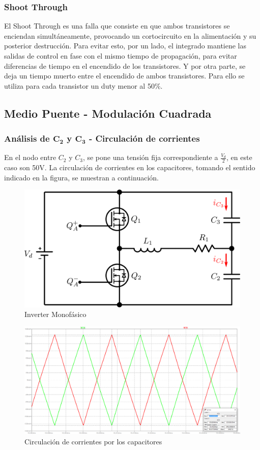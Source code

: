\documentclass[e4_tp3_main.tex]{subfiles}
\begin{document}
\subsubsection{Shoot Through}

El Shoot Through es una falla que consiste en que ambos transistores se enciendan simultáneamente, provocando un cortocircuito en la alimentación y su posterior destrucción. Para evitar esto, por un lado, el integrado mantiene las salidas de control en fase con el mismo tiempo de propagación, para evitar diferencias de tiempo en el encendido de los transistores. Y por otra parte, se deja un tiempo muerto entre el encendido de ambos transistores. Para ello se utiliza para cada transistor un duty menor al 50\%.
\newpage
\subsection{Medio Puente - Modulación Cuadrada}

\subsubsection{Análisis de $\mathbf{C_2}$ y $\mathbf{C_3}$ - Circulación de corrientes}

En el nodo entre $C_2$ y $C_3$, se pone una tensión fija correspondiente a $\frac{V_d}{2}$, en este caso son 50V. La circulación de corrientes en los capacitores, tomando el sentido indicado en la figura, se muestran a continuación.

\begin{figure}[H]
\centering
\includegraphics[width=0.8\linewidth]{Imagenes/parte1.png}
\caption{Inverter Monofásico}
\end{figure}

\begin{figure}[H]
\centering
\includegraphics[width=0.9\linewidth]{Imagenes/corrientesC.png}
\caption{Circulación de corrientes por los capacitores}
\end{figure}
\end{document}
